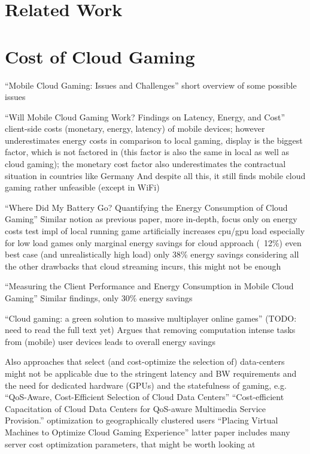 \section{Related Work}
\label{sec:relatedwork}


\section{Cost of Cloud Gaming}

``Mobile Cloud Gaming: Issues and Challenges'' \cite{Soliman2013}
short overview of some possible issues

``Will Mobile Cloud Gaming Work? Findings on Latency, Energy, and Cost'' \cite{Lampe:2013:MCG:2514943.2515398}
client-side costs (monetary, energy, latency) of mobile devices; however underestimates energy costs in comparison to local gaming, display is the biggest factor, which is not factored in (this factor is also the same in local as well as cloud gaming); the monetary cost factor also underestimates the contractual situation in countries like Germany
And despite all this, it still finds mobile cloud gaming rather unfeasible (except in WiFi)

``Where Did My Battery Go? Quantifying the Energy Consumption of Cloud Gaming'' \cite{6924295}
Similar notion as previous paper, more in-depth, focus only on energy costs
test impl of local running game artificially increases cpu/gpu load
especially for low load games only marginal energy savings for cloud approach (~12\%)
even best case (and unrealistically high load) only 38\% energy savings
considering all the other drawbacks that cloud streaming incurs, this might not be enough

``Measuring the Client Performance and Energy Consumption in Mobile Cloud Gaming'' \cite{Huang:2014:MCP:2755535.2755542}
Similar findings, only 30\% energy savings


``Cloud gaming: a green solution to massive multiplayer online games'' \cite{6882299}
(TODO: need to read the full text yet)
Argues that removing computation intense tasks from (mobile) user devices leads to overall energy savings


Also approaches that select (and cost-optimize the selection of) data-centers might not be applicable due to the stringent latency and BW requirements and the need for dedicated hardware (GPUs) and the statefulness of gaming, e.g.
``QoS-Aware, Cost-Efficient Selection of Cloud Data Centers'' \cite{6740249}
``Cost-efficient Capacitation of Cloud Data Centers for QoS-aware Multimedia Service Provision.'' \cite{hans2014cost} optimization to geographically clustered users
``Placing Virtual Machines to Optimize Cloud Gaming Experience'' \cite{6853364}
latter paper includes many server cost optimization parameters, that might be worth looking at

